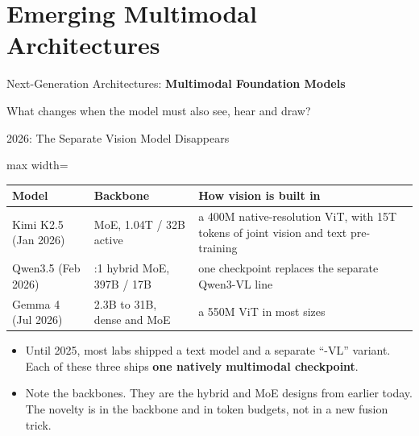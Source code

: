\section{Emerging Multimodal Architectures}

\begin{frame}{}
    \LARGE Next-Generation Architectures: \textbf{Multimodal Foundation Models}

    \vspace{1em}
    \normalsize What changes when the model must also see, hear and draw?
\end{frame}

\begin{frame}{2026: The Separate Vision Model Disappears}
    \begin{center}
    \small
    \renewcommand{\arraystretch}{1.25}
    \begin{adjustbox}{max width=\linewidth}\begin{tabular}{>{\raggedright\arraybackslash}p{2.8cm}>{\raggedright\arraybackslash}p{3.4cm}>{\raggedright\arraybackslash}p{6.9cm}}
        \toprule
        \textbf{Model} & \textbf{Backbone} & \textbf{How vision is built in} \\
        \midrule
        Kimi K2.5 (Jan 2026) & MoE, 1.04T / 32B active & a 400M native-resolution ViT, with 15T tokens of joint vision and text pre-training \\
        Qwen3.5 (Feb 2026) & 3:1 hybrid MoE, 397B / 17B & one checkpoint replaces the separate Qwen3-VL line \\
        Gemma 4 (Jul 2026) & 2.3B to 31B, dense and MoE & a 550M ViT in most sizes \\
        \bottomrule
    \end{tabular}\end{adjustbox}
    \end{center}
    \begin{itemize}\itemsep0.5em
        \item Until 2025, most labs shipped a text model and a separate ``-VL'' variant. Each of these three ships \textbf{one natively multimodal checkpoint}.
        \item Note the backbones. They are the hybrid and MoE designs from earlier today. The novelty is in the backbone and in token budgets, not in a new fusion trick.
    \end{itemize}
\end{frame}

